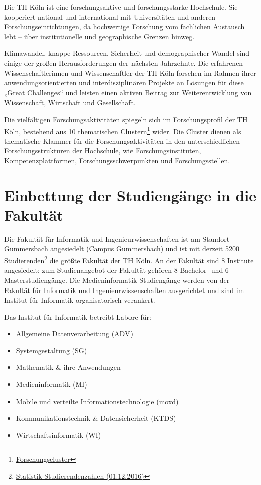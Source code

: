 Die TH Köln ist eine forschungsaktive und forschungsstarke Hochschule.
Sie kooperiert national und international mit Universitäten und anderen
Forschungseinrichtungen, da hochwertige Forschung vom fachlichen
Austausch lebt -- über institutionelle und geographische Grenzen hinweg.

Klimawandel, knappe Ressourcen, Sicherheit und demographischer Wandel
sind einige der großen Herausforderungen der nächsten Jahrzehnte. Die
erfahrenen Wissenschaftlerinnen und Wissenschaftler der TH Köln forschen
im Rahmen ihrer anwendungsorientierten und interdisziplinären Projekte
an Lösungen für diese „Great Challenges`` und leisten einen aktiven
Beitrag zur Weiterentwicklung von Wissenschaft, Wirtschaft und
Gesellschaft.

Die vielfältigen Forschungsaktivitäten spiegeln sich im Forschungsprofil
der TH Köln, bestehend aus 10 thematischen Clustern\footnote{\href{https://www.th-koeln.de/forschung/cluster_2734.php}{Forschungscluster}}
wider. Die Cluster dienen als thematische Klammer für die
Forschungsaktivitäten in den unterschiedlichen Forschungsstrukturen der
Hochschule, wie Forschungsinstituten, Kompetenzplattformen,
Forschungsschwerpunkten und Forschungsstellen.

\section{Einbettung der Studiengänge in die
Fakultät\label{/mi-2017/selbstbericht/0040-einbettung-in-die-hochschule/0000-einbettung-in-die-hochschule}}\label{einbettung-der-studienguxe4nge-in-die-fakultuxe4tpathlabelmi-2017selbstbericht0040-einbettung-in-die-hochschule0000-einbettung-in-die-hochschule}

Die Fakultät für Informatik und Ingenieurwissenschaften ist am Standort
Gummersbach angesiedelt (Campus Gummersbach) und ist mit derzeit 5200
Studierenden\footnote{\href{https://th-koeln.github.io/mi-2017/anhaenge/stat-Studentenzahlen_WS-2016_(01.12.2016).pdf}{Statistik
  Studierendenzahlen (01.12.2016)}} die größte Fakultät der TH Köln. An
der Fakultät sind 8 Institute angesiedelt; zum Studienangebot der
Fakultät gehören 8 Bachelor- und 6 Masterstudiengänge. Die
Medieninformatik Studiengänge werden von der Fakultät für Informatik und
Ingenieurwissenschaften ausgerichtet und sind im Institut für Informatik
organisatorisch verankert.

Das Institut für Informatik betreibt Labore für:

\begin{itemize}
\tightlist
\item
  Allgemeine Datenverarbeitung (ADV)
\item
  Systemgestaltung (SG)
\item
  Mathematik \& ihre Anwendungen
\item
  Medieninformatik (MI)
\item
  Mobile und verteilte Informationstechnologie (moxd)
\item
  Kommunikationstechnik \& Datensicherheit (KTDS)
\item
  Wirtschaftsinformatik (WI)
\end{itemize}

